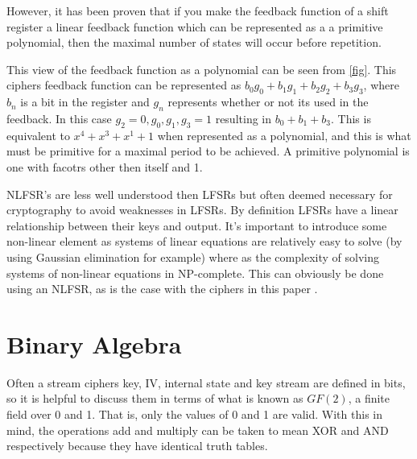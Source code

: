 \documentclass{report}
\let\Oldsection\section
\renewcommand{\section}{\FloatBarrier\Oldsection}
\begin{document}
However, it has been proven that if you make the feedback function of a shift register a linear feedback function which can be represented as a a primitive polynomial, then the maximal number of states will occur before repetition\cite{linearMaximal}.

This view of the feedback function as a polynomial can be seen from \ref{fig}. This ciphers feedback function can be represented as  $b_0g_0+b_1g_1+b_2g_2+b_3g_3$, where $b_n$ is a bit in the register and $g_n$ represents whether or not its used in the feedback. In this case $g_2 = 0, g_0, g_1, g_3 = 1$ resulting in $b_0+b_1+b_3$. This is equivalent to $x^4+x^3+x^1+1$ when represented as a polynomial, and this is what must be primitive for a maximal period to be achieved. A primitive polynomial is one with facotrs other then itself and 1.

\begin{figure}[!htb]
\end{figure}
NLFSR's are less well understood then LFSRs but often deemed necessary for cryptography to avoid weaknesses in LFSRs. By definition LFSRs have a linear relationship between their keys and output. It's important to introduce some non-linear element as systems of linear equations are relatively easy to solve (by using Gaussian elimination for example\cite{gaussian}) where as the complexity of solving systems of non-linear equations in NP-complete\cite{NonlinearComp}. This can obviously be done using an NLFSR, as is the case with the ciphers in this paper .

\section{Binary Algebra}
Often a stream ciphers key, IV, internal state and key stream are defined in bits, so it is helpful to discuss them in terms of what is known as $\mathit{GF(2)}$, a finite field over 0 and 1. That is, only the values of 0 and 1 are valid. With this in mind, the operations add and multiply can be taken to mean XOR and AND respectively because they have identical truth tables.
\end{document}
